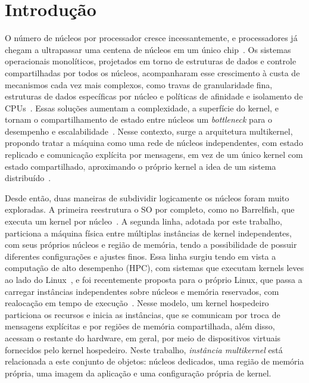 \documentclass[12pt]{article}
\begin{document}
\section{Introdução} \label{sec:introducao}
O número de núcleos por processador cresce incessantemente, e processadores já chegam a ultrapassar uma
centena de núcleos em um único chip~\cite{amd2024epyc}.
Os sistemas operacionais monolíticos, projetados em torno de estruturas de dados e controle compartilhadas por todos os núcleos, acompanharam esse crescimento à custa de mecanismos cada
vez mais complexos, como travas de granularidade fina, estruturas de dados específicas por núcleo e políticas de afinidade e
isolamento de CPUs~\cite{boydwickizer2010mosbench}. Essas soluções aumentam a complexidade, a superfície do kernel,
e tornam o compartilhamento de estado entre núcleos um \textit{bottleneck} para o desempenho e escalabilidade~\cite{boydwickizer2008corey}.
Nesse contexto, surge a arquitetura multikernel, propondo tratar a máquina como uma rede de núcleos independentes,
com estado replicado e comunicação explícita por mensagens, em vez de um único kernel com estado
compartilhado, aproximando o próprio kernel a idea de um sistema distribuído~\cite{baumann2009multikernel,wentzlaff2009fos}.

Desde então, duas maneiras de subdividir logicamente os núcleos foram muito exploradas.
A primeira reestrutura o SO por completo, como no Barrelfish, que executa um kernel por núcleo~\cite{baumann2009multikernel}.
A segunda linha, adotada por este trabalho, particiona a máquina física
entre múltiplas instâncias de kernel independentes, com seus próprios núcleos e região de memória,
tendo a possibilidade de possuir diferentes configurações e ajustes finos.
Essa linha surgiu tendo em vista a computação de alto desempenho (HPC), com sistemas que executam kernels leves ao lado do Linux~\cite{shimosawa2014ihk,park2012fusedos,gerofi2016survey},
e foi recentemente proposta para o próprio Linux, que passa a carregar instâncias independentes sobre núcleos e memória reservados, com realocação em tempo de
execução~\cite{wang2025multikernel,wang2025lpc}.
Nesse modelo, um kernel hospedeiro particiona os recursos e inicia as
instâncias, que se comunicam por troca de mensagens explícitas e por regiões de memória compartilhada, além disso, acessam
o restante do hardware, em geral, por meio de dispositivos virtuais fornecidos pelo kernel hospedeiro.
Neste trabalho, \textit{instância multikernel} está relacionada a este conjunto de objetos: núcleos dedicados, uma região de memória própria,
uma imagem da aplicação e uma configuração própria de kernel.
\end{document}
